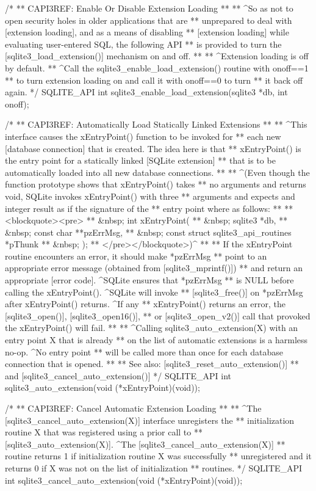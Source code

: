 \begin{Codex}[label=sqlite3.h,numbers=left]
{/*
** CAPI3REF: Enable Or Disable Extension Loading
**
** ^So as not to open security holes in older applications that are
** unprepared to deal with [extension loading], and as a means of disabling
** [extension loading] while evaluating user-entered SQL, the following API
** is provided to turn the [sqlite3_load_extension()] mechanism on and off.
**
** ^Extension loading is off by default.
** ^Call the sqlite3_enable_load_extension() routine with onoff==1
** to turn extension loading on and call it with onoff==0 to turn
** it back off again.
*/
SQLITE_API int sqlite3_enable_load_extension(sqlite3 *db, int onoff);

/*
** CAPI3REF: Automatically Load Statically Linked Extensions
**
** ^This interface causes the xEntryPoint() function to be invoked for
** each new [database connection] that is created.  The idea here is that
** xEntryPoint() is the entry point for a statically linked [SQLite extension]
** that is to be automatically loaded into all new database connections.
**
** ^(Even though the function prototype shows that xEntryPoint() takes
** no arguments and returns void, SQLite invokes xEntryPoint() with three
** arguments and expects and integer result as if the signature of the
** entry point where as follows:
**
** <blockquote><pre>
** &nbsp;  int xEntryPoint(
** &nbsp;    sqlite3 *db,
** &nbsp;    const char **pzErrMsg,
** &nbsp;    const struct sqlite3_api_routines *pThunk
** &nbsp;  );
** </pre></blockquote>)^
**
** If the xEntryPoint routine encounters an error, it should make *pzErrMsg
** point to an appropriate error message (obtained from [sqlite3_mprintf()])
** and return an appropriate [error code].  ^SQLite ensures that *pzErrMsg
** is NULL before calling the xEntryPoint().  ^SQLite will invoke
** [sqlite3_free()] on *pzErrMsg after xEntryPoint() returns.  ^If any
** xEntryPoint() returns an error, the [sqlite3_open()], [sqlite3_open16()],
** or [sqlite3_open_v2()] call that provoked the xEntryPoint() will fail.
**
** ^Calling sqlite3_auto_extension(X) with an entry point X that is already
** on the list of automatic extensions is a harmless no-op. ^No entry point
** will be called more than once for each database connection that is opened.
**
** See also: [sqlite3_reset_auto_extension()]
** and [sqlite3_cancel_auto_extension()]
*/
SQLITE_API int sqlite3_auto_extension(void (*xEntryPoint)(void));

/*
** CAPI3REF: Cancel Automatic Extension Loading
**
** ^The [sqlite3_cancel_auto_extension(X)] interface unregisters the
** initialization routine X that was registered using a prior call to
** [sqlite3_auto_extension(X)].  ^The [sqlite3_cancel_auto_extension(X)]
** routine returns 1 if initialization routine X was successfully 
** unregistered and it returns 0 if X was not on the list of initialization
** routines.
*/
SQLITE_API int sqlite3_cancel_auto_extension(void (*xEntryPoint)(void));

}
\end{Codex}
